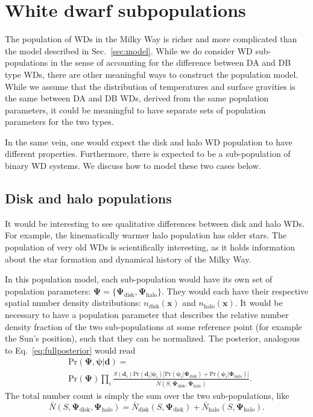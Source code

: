 \documentclass[fleqn,usenatbib]{mnras}
\newcommand{\popp}{\boldsymbol{\Psi}}
\newcommand{\objp}{\boldsymbol{\psi}}
\newcommand{\data}{\mathbf{d}}
\newcommand{\pr}{\text{Pr}}
\begin{document}
\section{White dwarf subpopulations}\label{sec:subpopulations}

The population of WDs in the Milky Way is richer and more complicated than the model described in Sec.~\ref{sec:model}. While we do consider WD sub-populations in the sense of accounting for the difference between DA and DB type WDs, there are other meaningful ways to construct the population model. While we assume that the distribution of temperatures and surface gravities is the same between DA and DB WDs, derived from the same population parameters, it could be meaningful to have separate sets of population parameters for the two types.

In the same vein, one would expect the disk and halo WD population to have different properties. Furthermore, there is expected to be a sub-population of binary WD systems. We discuss how to model these two cases below.



\subsection{Disk and halo populations}

It would be interesting to see qualitative differences between disk and halo WDs. For example, the kinematically warmer halo population has older stars. The population of very old WDs is scientifically interesting, as it holds information about the star formation and dynamical history of the Milky Way.

In this population model, each sub-population would have its own set of population parameters: $\popp = \{ \popp_\text{disk},\popp_\text{halo} \}$. They would each have their respective spatial number density distributions: $n_\text{disk}(\mathbf{x})$ and $n_\text{halo}(\mathbf{x})$. It would be necessary to have a population parameter that describes the relative number density fraction of the two sub-populations at some reference point (for example the Sun's position), such that they can be normalized. The posterior, analogous to Eq.~\eqref{eq:fullposterior} would read
\begin{equation}\label{eq:posterior_disk_halo}
\begin{split}
	& \pr(\popp,\objp | \data ) = \\
	& \pr(\popp)
	\prod_i 
	\frac{S(\data_i) \pr(\data_i | \objp_i)
	\Big[ \pr(\objp_i | \popp_\text{disk})+\pr(\objp_i | \popp_\text{halo}) \Big] }
	{\bar{N}(S,\popp_\text{disk},\popp_\text{halo})}.
\end{split}
\end{equation}
The total number count is simply the sum over the two sub-populations, like
\begin{equation}
	\bar{N}(S,\popp_\text{disk},\popp_\text{halo})=\bar{N}_\text{disk}(S,\popp_\text{disk})+\bar{N}_\text{halo}(S,\popp_\text{halo}).
\end{equation}
\end{document}
